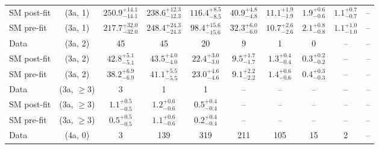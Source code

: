 \begin{table}[h!]
{\begin{tabular}{lccccccccc}
	SM post-fit & (3a, 1)           & $250.9^{+ 14.1 }_{- 14.1 }$    & $238.6^{+ 12.3 }_{- 12.3 }$    & $116.4^{+ 8.5 }_{- 8.5 }$   & $40.9^{+ 4.8 }_{- 4.8 }$    & $11.1^{+ 1.9 }_{- 1.9 }$    & $1.9^{+ 0.6 }_{- 0.6 }$  & $1.1^{+ 0.7 }_{- 0.7 }$  & --           \\[0.5ex] 
	SM pre-fit  & (3a, 1)           & $217.7^{+ 32.0 }_{- 32.0 }$    & $248.4^{+ 24.3 }_{- 24.3 }$    & $98.4^{+ 15.6 }_{- 15.6 }$  & $32.3^{+ 6.0 }_{- 6.0 }$    & $10.7^{+ 2.6 }_{- 2.6 }$    & $2.1^{+ 0.8 }_{- 0.8 }$  & $1.1^{+ 1.0 }_{- 1.0 }$  & --           \\[0.5ex] 
	Data        & (3a, 2)           & 45                             & 45                             & 20                          & 9                           & 1                           & 0                        & --                       & --           \\[0.5ex] 
	SM post-fit & (3a, 2)           & $42.8^{+ 5.1 }_{- 5.1 }$       & $43.5^{+ 4.0 }_{- 4.0 }$       & $22.4^{+ 3.0 }_{- 3.0 }$    & $9.5^{+ 1.7 }_{- 1.7 }$     & $1.3^{+ 0.4 }_{- 0.4 }$     & $0.3^{+ 0.2 }_{- 0.2 }$  & --                       & --           \\[0.5ex] 
	SM pre-fit  & (3a, 2)           & $38.2^{+ 6.9 }_{- 6.9 }$       & $41.1^{+ 5.5 }_{- 5.5 }$       & $23.0^{+ 4.6 }_{- 4.6 }$    & $9.1^{+ 2.2 }_{- 2.2 }$     & $1.4^{+ 0.6 }_{- 0.6 }$     & $0.4^{+ 0.3 }_{- 0.3 }$  & --                       & --           \\[0.5ex] 
	Data        & (3a, $\ge3$)      & 3                              & 1                              & 1                           & --                          & --                          & --                       & --                       & --           \\[0.5ex] 
	SM post-fit & (3a, $\ge3$)      & $1.1^{+ 0.5 }_{- 0.5 }$        & $1.2^{+ 0.6 }_{- 0.6 }$        & $0.5^{+ 0.4 }_{- 0.4 }$     & --                          & --                          & --                       & --                       & --           \\[0.5ex] 
	SM pre-fit  & (3a, $\ge3$)      & $0.5^{+ 0.5 }_{- 0.5 }$        & $1.1^{+ 0.6 }_{- 0.6 }$        & $0.2^{+ 0.4 }_{- 0.4 }$     & --                          & --                          & --                       & --                       & --           \\[0.5ex] 
	Data        & (4a, 0)           & 3                              & 139                            & 319                         & 211                         & 105                         & 15                       & 2                        & --           \\[0.5ex] 

\end{tabular}}
\end{table}
